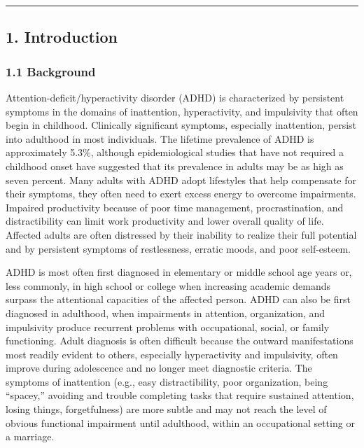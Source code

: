 \documentclass[
  12pt,
  letterpaper,
]{article}
\renewcommand{\[}{\begin{singlespace}\oldDisplayMath}
\renewcommand{\]}{\endoldDisplayMath\end{singlespace}\vspace{\baselineskip}}
\begin{document}
\begin{center}\rule{0.5\linewidth}{0.5pt}\end{center}

\subsection{1. Introduction}\label{introduction}

\subsubsection{1.1 Background}\label{background}

Attention-deficit/hyperactivity disorder (ADHD) is characterized by
persistent symptoms in the domains of inattention, hyperactivity, and
impulsivity that often begin in childhood. Clinically significant
symptoms, especially inattention, persist into adulthood in most
individuals. The lifetime prevalence of ADHD is approximately 5.3\%,
although epidemiological studies that have not required a childhood
onset have suggested that its prevalence in adults may be as high as
seven percent. Many adults with ADHD adopt lifestyles that help
compensate for their symptoms, they often need to exert excess energy to
overcome impairments. Impaired productivity because of poor time
management, procrastination, and distractibility can limit work
productivity and lower overall quality of life. Affected adults are
often distressed by their inability to realize their full potential and
by persistent symptoms of restlessness, erratic moods, and poor
self-esteem.

ADHD is most often first diagnosed in elementary or middle school age
years or, less commonly, in high school or college when increasing
academic demands surpass the attentional capacities of the affected
person. ADHD can also be first diagnosed in adulthood, when impairments
in attention, organization, and impulsivity produce recurrent problems
with occupational, social, or family functioning. Adult diagnosis is
often difficult because the outward manifestations most readily evident
to others, especially hyperactivity and impulsivity, often improve
during adolescence and no longer meet diagnostic criteria. The symptoms
of inattention (e.g., easy distractibility, poor organization, being
``spacey,'' avoiding and trouble completing tasks that require sustained
attention, losing things, forgetfulness) are more subtle and may not
reach the level of obvious functional impairment until adulthood, within
an occupational setting or a marriage.
\end{document}
